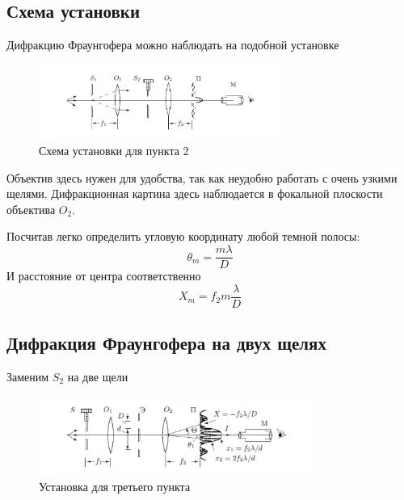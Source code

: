 \documentclass[a4paper, 12pt]{article}%
\begin{document}
\subsection{Схема установки}
Дифракцию Фраунгофера можно наблюдать на подобной установке 

\begin{figure}[h]
\begin{center}
\includegraphics[width = 0.7\textwidth]{pics/4.png}
\caption{Схема установки для пункта 2}
\end{center}
\end{figure}

Объектив здесь нужен для удобства, так как неудобно работать с очень узкими щелями. Дифракционная картина здесь наблюдается в фокальной плоскости объектива $O_2$. 

Посчитав легко определить угловую координату любой темной полосы:
\begin{equation}
\theta_m = \frac{m \lambda}{D}
\end{equation}
И расстояние от центра соответственно 
\begin{equation}
X_m = f_2m\frac{\lambda}{D}
\end{equation}

\subsection{Дифракция Фраунгофера на двух щелях}

Заменим $S_2$ на две щели 

\begin{figure}[h]
\begin{center}
\includegraphics[width = 0.8\textwidth]{pics/5.png}
\caption{Установка для третьего пункта}
\end{center}
\end{figure}
\end{document}
